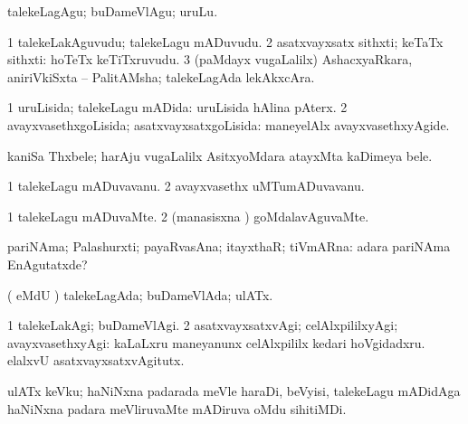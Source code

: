 \noindent
\gl{\akirx}
\expl{}
\bmng
talekeLagAgu; buDameVlAgu; uruLu. 
\emng
\eentry

\bentry
{}
\gl{\nA}
\expl{}
\bmng
\bnum
\num{1} talekeLakAguvudu; talekeLagu mADuvudu. 
\num{2} asatxvayxsatx sithxti; keTaTx sithxti:  hoTeTx keTiTxruvudu. 
\num{3} (paMdayx \mo vugaLalilx) AshacxyaRkara, aniriVkiSxta -- PalitAMsha; talekeLagAda lekAkxcAra. 
\enum
\emng
\eentry

\bentry
{} 
\gl{\gu}
\expl{}
\bmng
\bnum
\num{1} uruLisida; talekeLagu mADida:  uruLisida hAlina pAterx. 
\num{2} avayxvasethxgoLisida; asatxvayxsatxgoLisida:  maneyelAlx avayxvasethxyAgide. 
\enum
\emng
\eentry

\bentry
{}
\gl{\nA}
\expl{}
\bmng
kaniSa Thxbele; harAju \mo vugaLalilx AsitxyoMdara atayxMta kaDimeya bele. 
\emng
\eentry

\bentry
{} 
\gl{\nA}
\bmng
\bnum
\num{1} talekeLagu mADuvavanu. 
\num{2} avayxvasethx uMTumADuvavanu. 
\enum
\emng
\eentry

\bentry
{} 
\gl{\kirxvi}
\expl{}
\bmng
\bnum
\num{1} talekeLagu mADuvaMte. 
\num{2} (manasisxna \vi) goMdalavAguvaMte. 
\enum
\emng
\eentry

\bentry
{} 
\gl{\nA}
\expl{}
\bmng
pariNAma; Palashurxti; payaRvasAna; itayxthaR; tiVmARna:  adara pariNAma EnAgutatxde? 
\emng
\eentry

\bentry
{} 
\gl{\gu}
\expl{}
\bmng
( eMdU \parx) talekeLagAda; buDameVlAda; ulATx. 
\emng
\eentry

\bentry
{} 
\gl{\kirxvi}
\expl{}
\bmng
\bnum
\num{1} talekeLakAgi; buDameVlAgi. 
\num{2} asatxvayxsatxvAgi; celAlxpililxyAgi; avayxvasethxyAgi:  kaLaLxru maneyanunx celAlxpililx kedari hoVgidadxru.  elalxvU asatxvayxsatxvAgitutx. 
\enum
\emng
\eentry

\bentry
{}
\gl{\nA}
\expl{}
\bmng
ulATx keVku; haNiNxna padarada meVle haraDi, beVyisi, talekeLagu mADidAga haNiNxna padara meVliruvaMte mADiruva oMdu sihitiMDi. 
\emng
\eentry

